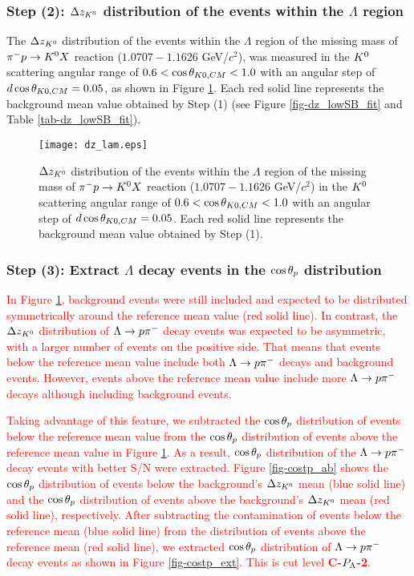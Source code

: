 \subsubsection{Step (2): $\Delta z_{K^{0}}$ distribution of the events within the $\Lambda$ region}
The $\Delta z_{K^{0}}$ distribution of the events within the $\Lambda$ region of the missing mass of $\pi^- p \to K^0 X$ reaction ($1.0707-1.1626$ GeV/$c^{2}$), was measured in the $K^{0}$ scattering angular range of $0.6<\cos{\theta_{K0,CM}}<1.0$ with an angular step of $d\cos{\theta_{K0,CM}}=0.05$, as shown in Figure \ref{fig-dz_lam}. Each red solid line represents the background mean value obtained by Step (1) (see Figure \ref{fig-dz_lowSB_fit} and Table \ref{tab-dz_lowSB_fit}). 

\begin{figure}[h]
  \centering
  \texttt{[image: dz\_lam.eps]}
  \caption{$\Delta z_{K^{0}}$ distribution of the events within the $\Lambda$ region of the missing mass of $\pi^- p \to K^0 X$ reaction ($1.0707-1.1626$ GeV/$c^{2}$) in the $K^{0}$ scattering angular range of $0.6<\cos{\theta_{K0,CM}}<1.0$ with an angular step of $d\cos{\theta_{K0,CM}}=0.05$. Each red solid line represents the background mean value obtained by Step (1).}
  \label{fig-dz_lam}
\end{figure}


\subsubsection{Step (3): Extract $\Lambda$ decay events in the $\cos{\theta_p}$ distribution}
\label{subsubsec-extcostp}

\textcolor{red}{ In Figure \ref{fig-dz_lam}, background events were still included and expected to be distributed symmetrically around the reference mean value (red solid line). In contrast, the $\Delta z_{K^{0}}$ distribution of $\Lambda\to p\pi^{-}$ decay events was expected to be asymmetric, with a larger number of events on the positive side. That means that events below the reference mean value include both $\Lambda\to p\pi^{-}$ decays and background events. However, events above the reference mean value include more $\Lambda\to p\pi^{-}$ decays although including background events. }

\textcolor{red}{ Taking advantage of this feature, we subtracted the $\cos{\theta_p}$ distribution of events below the reference mean value from the $\cos{\theta_p}$ distribution of events above the reference mean value in Figure \ref{fig-dz_lam}. As a result, $\cos{\theta_p}$ distribution of the $\Lambda\to p\pi^{-}$ decay events with better S/N were extracted. Figure \ref{fig-costp_ab} shows the $\cos{\theta_p}$ distribution of events below the background's $\Delta z_{K^{0}}$ mean (blue solid line) and the $\cos{\theta_p}$ distribution of events above the background's $\Delta z_{K^{0}}$ mean (red solid line), respectively. After subtracting the contamination of events below the reference mean (blue solid line) from the distribution of events above the reference mean (red solid line), we extracted $\cos{\theta_p}$ distribution of $\Lambda\to p\pi^{-}$ decay events as shown in Figure \ref{fig-costp_ext}. This is cut level {\bf C-$P_{\Lambda}$-2}. }

